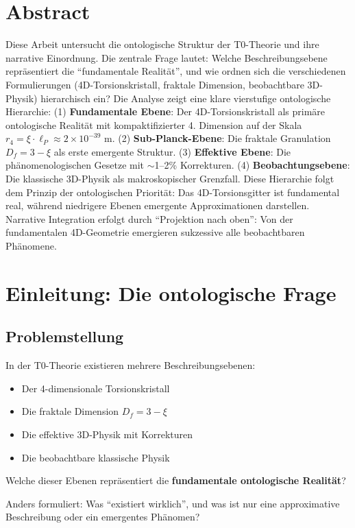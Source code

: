 \section*{Abstract}
		Diese Arbeit untersucht die ontologische Struktur der T0-Theorie und ihre narrative Einordnung. Die zentrale Frage lautet: Welche Beschreibungsebene repräsentiert die \enquote{fundamentale Realität}, und wie ordnen sich die verschiedenen Formulierungen (4D-Torsionskristall, fraktale Dimension, beobachtbare 3D-Physik) hierarchisch ein? Die Analyse zeigt eine klare vierstufige ontologische Hierarchie: (1) \textbf{Fundamentale Ebene}: Der 4D-Torsionskristall als primäre ontologische Realität mit kompaktifizierter 4. Dimension auf der Skala $r_4 = \xi \cdot \ell_P \approx 2 \times 10^{-39}$ m. (2) \textbf{Sub-Planck-Ebene}: Die fraktale Granulation $D_f = 3-\xi$ als erste emergente Struktur. (3) \textbf{Effektive Ebene}: Die phänomenologischen Gesetze mit $\sim$1--2\% Korrekturen. (4) \textbf{Beobachtungsebene}: Die klassische 3D-Physik als makroskopischer Grenzfall. Diese Hierarchie folgt dem Prinzip der ontologischen Priorität: Das 4D-Torsionsgitter ist fundamental real, während niedrigere Ebenen emergente Approximationen darstellen. Narrative Integration erfolgt durch \enquote{Projektion nach oben}: Von der fundamentalen 4D-Geometrie emergieren sukzessive alle beobachtbaren Phänomene.

	
	
	
	\section{Einleitung: Die ontologische Frage}
	
	\subsection{Problemstellung}
	
	In der T0-Theorie existieren mehrere Beschreibungsebenen:
	\begin{itemize}
		\item Der 4-dimensionale Torsionskristall
		\item Die fraktale Dimension $D_f = 3-\xi$
		\item Die effektive 3D-Physik mit Korrekturen
		\item Die beobachtbare klassische Physik
	\end{itemize}
	
	\begin{important}
		Welche dieser Ebenen repräsentiert die \textbf{fundamentale ontologische Realität}?
		
		Anders formuliert: Was \enquote{existiert wirklich}, und was ist nur eine approximative Beschreibung oder ein emergentes Phänomen?
	\end{important}
	
